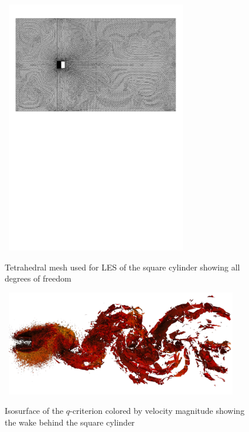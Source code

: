 \begin{figure}[h] \tt
\centering
\includegraphics[width=0.7\textwidth]{sqcyl-mesh-tet-plotnodes.pdf}
\caption{Tetrahedral mesh used for LES of the square cylinder showing all degrees of freedom}
\label{sqcylmesh}
\end{figure}

\begin{figure}[h] \tt
\centering
\includegraphics[width=0.9\textwidth]{sqcyl-tet-wsm-newwallfn-coarse3-qcrit-010-velomag.pdf}
\caption{Isosurface of the $q$-criterion colored by velocity magnitude showing the wake behind the square cylinder}
\label{sqcylqcrit}
\end{figure}

